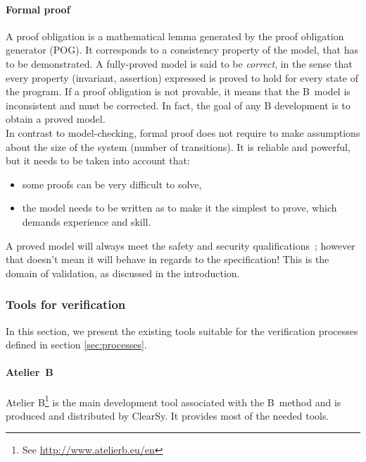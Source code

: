\paragraph{Formal proof}
A proof obligation is a mathematical lemma generated by the proof obligation generator (POG). It corresponds to a consistency property of the model, that has to be demonstrated.
A fully-proved model is said to be {\itshape correct}, in the sense that every property (invariant, assertion) expressed is proved to hold for every state of the program. If a proof obligation is not provable, it means that the B~model is inconsistent and must be corrected. In fact, the goal of any B development is to obtain a proved model.\\
In contrast to model-checking, formal proof does not require to make assumptions about the size of the system (number of transitions). It is reliable and powerful, but it needs to be taken into account that:
\begin{itemize}
\item some proofs can be very difficult to solve,
\item the model needs to be written as to make it the simplest to prove, which demands experience and skill.
\end{itemize}
A proved model will always meet the safety and security qualifications~; however that doesn't mean it will behave in regards to the specification! This is the domain of validation, as discussed in the introduction.

\subsubsection{Tools for verification}
\label{sec:tools}

In this section, we present the existing tools suitable for the verification processes defined in section \ref{sec:processes}.

\paragraph{Atelier~B}
\label{subsec:atelierb}
Atelier B\footnote{See \url{http://www.atelierb.eu/en}} is the main development tool associated with the B~method and is produced and distributed by ClearSy. It provides most of the needed tools.

